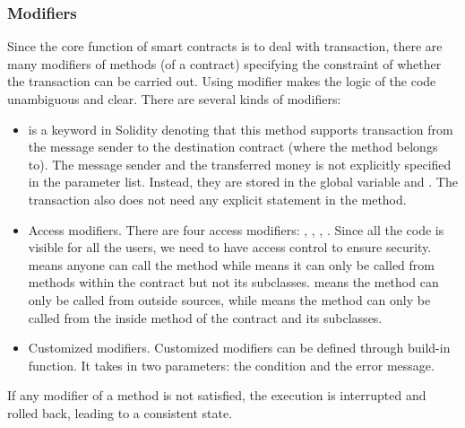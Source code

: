 \documentclass{article}
\begin{document}
\subsubsection{Modifiers}
Since the core function of smart contracts is to deal with transaction, there are many modifiers of methods (of a contract) specifying the constraint of whether the transaction can be carried out. Using modifier makes the logic of the code unambiguous and clear. There are several kinds of modifiers:
\begin{itemize}
    \item {} is a keyword in Solidity denoting that this method supports transaction from the message sender to the destination contract (where the method belongs to). The message sender and the transferred money is not explicitly specified in the parameter list. Instead, they are stored in the global variable  and . The transaction also does not need any explicit statement in the method.
    \item Access modifiers. There are four access modifiers: , , , . Since all the code is visible for all the users, we need to have access control to ensure security.  means anyone can call the method while  means it can only be called from methods within the contract but not its subclasses.  means the method can only be called from outside sources, while  means the method can only be called from the inside method of the contract and its subclasses.
    \item Customized modifiers. Customized modifiers can be defined through  build-in function. It takes in two parameters: the condition and the error message.
\end{itemize}

If any modifier of a method is not satisfied, the execution is interrupted and rolled back, leading to a consistent state.
\end{document}

